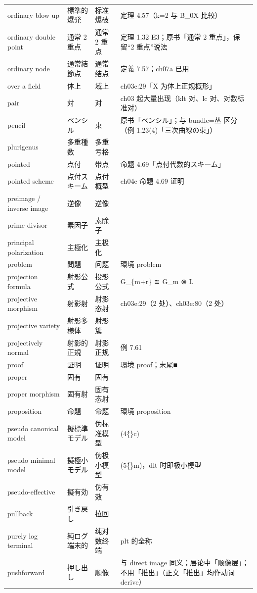 \begin{longtable}{@{}>{\raggedright\arraybackslash}p{}>{\raggedright\arraybackslash}p{}>{\raggedright\arraybackslash}p{}>{\raggedright\arraybackslash}p{}@{}}
ordinary blow up & 標準的爆発 & 标准爆破 & 定理 4.57（k=2 与 B\_0X 比较） \\
ordinary double point & 通常 2 重点 & 通常 2 重点 & 定理 1.32 E3；原书「通常 2 重点」，保留“2 重点”说法 \\
ordinary node & 通常結節点 & 通常结点 & 定義 7.57；ch07a 已用 \\
over a field & 体上 & 域上 & ch03e:29「X 为体上正规概形」 \\
pair & 対 & 对 & ch03 起大量出现（klt 对、lc 对、对数标准对） \\
pencil & ペンシル & 束 & 原书「ペンシル」；与 bundle=丛 区分（例 1.23(4)「三次曲線の束」） \\
plurigenus & 多重種数 & 多重亏格 & 7.71 \\
pointed & 点付 & 带点 & 命题 4.69「点付代数的スキーム」 \\
pointed scheme & 点付スキーム & 点付概型 & ch04e 命题 4.69 证明 \\
preimage / inverse image & 逆像 & 逆像 &  \\
prime divisor & 素因子 & 素除子 &  \\
principal polarization & 主極化 & 主极化 & 7.75 \\
problem & 問題 & 问题 & 環境 problem \\
projection formula & 射影公式 & 投影公式 & G\_\{m+r\} ≅ G\_m ⊗ L \\
projective morphism & 射影射 & 射影态射 & ch03e:29（2 处）、ch03e:80（2 处） \\
projective variety & 射影多様体 & 射影簇 &  \\
projectively normal & 射影的正規 & 射影正规 & 例 7.61 \\
proof & 証明 & 证明 & 環境 proof；末尾■ \\
proper & 固有 & 固有 &  \\
proper morphism & 固有射 & 固有态射 &  \\
proposition & 命題 & 命题 & 環境 proposition \\
pseudo canonical model & 擬標準モデル & 伪标准模型 & (4\^\{\}c) \\
pseudo minimal model & 擬極小モデル & 伪极小模型 & (5\^\{\}m)，dlt 时即极小模型 \\
pseudo-effective & 擬有効 & 伪有效 &  \\
pullback & 引き戻し & 拉回 &  \\
purely log terminal & 純ログ端末的 & 纯对数终端 & plt 的全称 \\
pushforward & 押し出し & 顺像 & 与 direct image 同义；层论中「顺像层」；不用「推出」（正文「推出」均作动词 derive） \\

\end{longtable}
